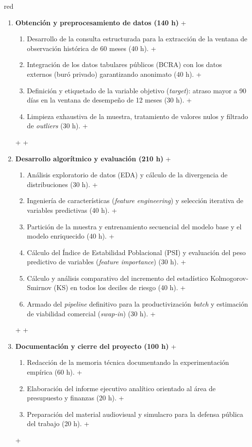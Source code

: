 \documentclass[
 11pt, %
-%
+codirector, %
 ]{charter}
\begin{document}
\begin{table}[ht]
\begin{table}[ht]
\begin{consigna}{red}
\begin{enumerate}
+
+    \item \textbf{Obtención y preprocesamiento de datos (140 h)}
+    \begin{enumerate}
+        \item Desarrollo de la consulta estructurada para la extracción de la ventana de observación histórica de 60 meses (40 h).
+        \item Integración de los datos tabulares públicos (BCRA) con los datos externos (buró privado) garantizando anonimato (40 h).
+        \item Definición y etiquetado de la variable objetivo (\textit{target}): atraso mayor a 90 días en la ventana de desempeño de 12 meses (30 h).
+        \item Limpieza exhaustiva de la muestra, tratamiento de valores nulos y filtrado de \textit{outliers} (30 h).
+    \end{enumerate}
+
+    \item \textbf{Desarrollo algorítmico y evaluación (210 h)}
+    \begin{enumerate}
+        \item Análisis exploratorio de datos (EDA) y cálculo de la divergencia de distribuciones (30 h).
+        \item Ingeniería de características (\textit{feature engineering}) y selección iterativa de variables predictivas (40 h).
+        \item Partición de la muestra y entrenamiento secuencial del modelo base y el modelo enriquecido (40 h).
+        \item Cálculo del Índice de Estabilidad Poblacional (PSI) y evaluación del peso predictivo de variables (\textit{feature importance}) (30 h).
+        \item Cálculo y análisis comparativo del incremento del estadístico Kolmogorov-Smirnov (KS) en todos los deciles de riesgo (40 h).
+        \item Armado del \textit{pipeline} definitivo para la productivización \textit{batch} y estimación de viabilidad comercial (\textit{swap-in}) (30 h).
+    \end{enumerate}
+
+    \item \textbf{Documentación y cierre del proyecto (100 h)}
+    \begin{enumerate}
+        \item Redacción de la memoria técnica documentando la experimentación empírica (60 h).
+        \item Elaboración del informe ejecutivo analítico orientado al área de presupuesto y finanzas (20 h).
+        \item Preparación del material audiovisual y simulacro para la defensa pública del trabajo (20 h).
+    \end{enumerate}
+
 \end{enumerate}
 

\end{consigna}
\end{table}
\end{table}
\end{document}
